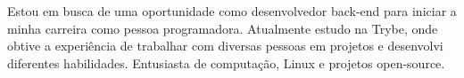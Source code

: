 

\begin{cvparagraph}


Estou em busca de uma oportunidade como desenvolvedor back-end para iniciar a minha carreira como pessoa programadora. Atualmente estudo na Trybe, onde obtive a experiência de trabalhar com diversas pessoas em projetos e desenvolvi diferentes habilidades. Entusiasta de computação, Linux e projetos open-source.
\end{cvparagraph}
